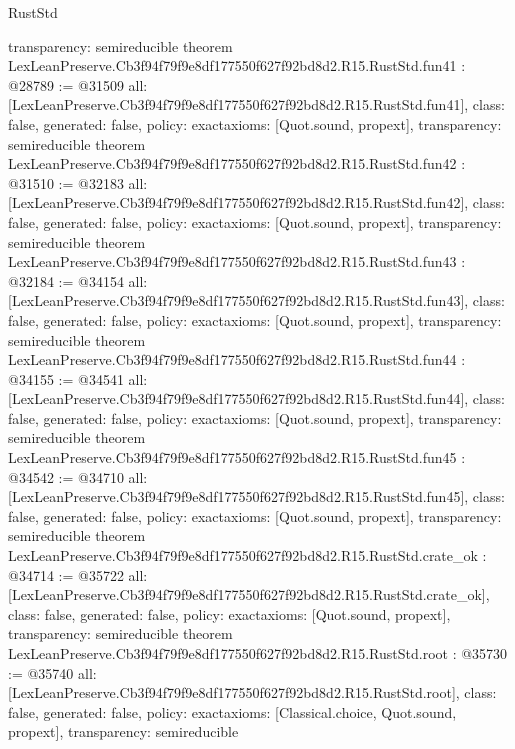 \begin{lexlean}{RustStd}
\begin{coremodule}
{  transparency: semireducible
}
theorem LexLeanPreserve.Cb3f94f79f9e8df177550f627f92bd8d2.R15.RustStd.fun41 : @28789 := @31509 {
  all: [LexLeanPreserve.Cb3f94f79f9e8df177550f627f92bd8d2.R15.RustStd.fun41],
  class: false,
  generated: false,
  policy: exact{axioms: [Quot.sound, propext]},
  transparency: semireducible
}
theorem LexLeanPreserve.Cb3f94f79f9e8df177550f627f92bd8d2.R15.RustStd.fun42 : @31510 := @32183 {
  all: [LexLeanPreserve.Cb3f94f79f9e8df177550f627f92bd8d2.R15.RustStd.fun42],
  class: false,
  generated: false,
  policy: exact{axioms: [Quot.sound, propext]},
  transparency: semireducible
}
theorem LexLeanPreserve.Cb3f94f79f9e8df177550f627f92bd8d2.R15.RustStd.fun43 : @32184 := @34154 {
  all: [LexLeanPreserve.Cb3f94f79f9e8df177550f627f92bd8d2.R15.RustStd.fun43],
  class: false,
  generated: false,
  policy: exact{axioms: [Quot.sound, propext]},
  transparency: semireducible
}
theorem LexLeanPreserve.Cb3f94f79f9e8df177550f627f92bd8d2.R15.RustStd.fun44 : @34155 := @34541 {
  all: [LexLeanPreserve.Cb3f94f79f9e8df177550f627f92bd8d2.R15.RustStd.fun44],
  class: false,
  generated: false,
  policy: exact{axioms: [Quot.sound, propext]},
  transparency: semireducible
}
theorem LexLeanPreserve.Cb3f94f79f9e8df177550f627f92bd8d2.R15.RustStd.fun45 : @34542 := @34710 {
  all: [LexLeanPreserve.Cb3f94f79f9e8df177550f627f92bd8d2.R15.RustStd.fun45],
  class: false,
  generated: false,
  policy: exact{axioms: [Quot.sound, propext]},
  transparency: semireducible
}
theorem LexLeanPreserve.Cb3f94f79f9e8df177550f627f92bd8d2.R15.RustStd.crate_ok : @34714 := @35722 {
  all: [LexLeanPreserve.Cb3f94f79f9e8df177550f627f92bd8d2.R15.RustStd.crate_ok],
  class: false,
  generated: false,
  policy: exact{axioms: [Quot.sound, propext]},
  transparency: semireducible
}
theorem LexLeanPreserve.Cb3f94f79f9e8df177550f627f92bd8d2.R15.RustStd.root : @35730 := @35740 {
  all: [LexLeanPreserve.Cb3f94f79f9e8df177550f627f92bd8d2.R15.RustStd.root],
  class: false,
  generated: false,
  policy: exact{axioms: [Classical.choice, Quot.sound, propext]},
  transparency: semireducible
}


\end{coremodule}
\end{lexlean}
